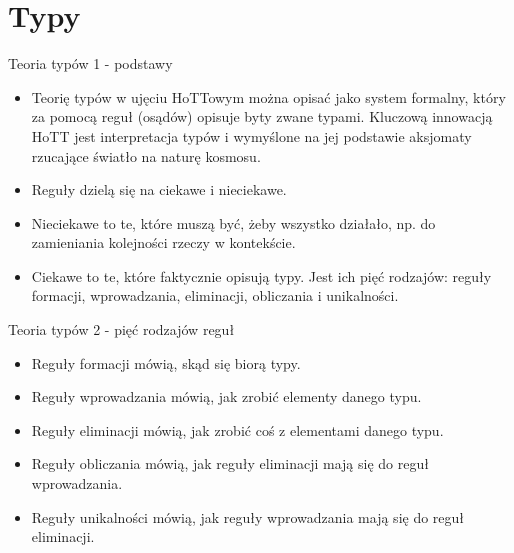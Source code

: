 \documentclass{beamer}
\begin{document}
\section{Typy}

\begin{frame}{Teoria typów 1 - podstawy}
\begin{itemize}
	\item Teorię typów w ujęciu HoTTowym można opisać jako system formalny, który za pomocą reguł (osądów) opisuje byty zwane typami. Kluczową innowacją HoTT jest interpretacja typów i wymyślone na jej podstawie aksjomaty rzucające światło na naturę kosmosu.
	\item Reguły dzielą się na ciekawe i nieciekawe.
	\item Nieciekawe to te, które muszą być, żeby wszystko działało, np. do zamieniania kolejności rzeczy w kontekście.
	\item Ciekawe to te, które faktycznie opisują typy. Jest ich pięć rodzajów: reguły formacji, wprowadzania, eliminacji, obliczania i unikalności.
\end{itemize}
\end{frame}

\begin{frame}{Teoria typów 2 - pięć rodzajów reguł}
\begin{itemize}
	\item Reguły formacji mówią, skąd się biorą typy.
	\item Reguły wprowadzania mówią, jak zrobić elementy danego typu.
	\item Reguły eliminacji mówią, jak zrobić coś z elementami danego typu.
	\item Reguły obliczania mówią, jak reguły eliminacji mają się do reguł wprowadzania.
	\item Reguły unikalności mówią, jak reguły wprowadzania mają się do reguł eliminacji.
\end{itemize}
\end{frame}
\end{document}
